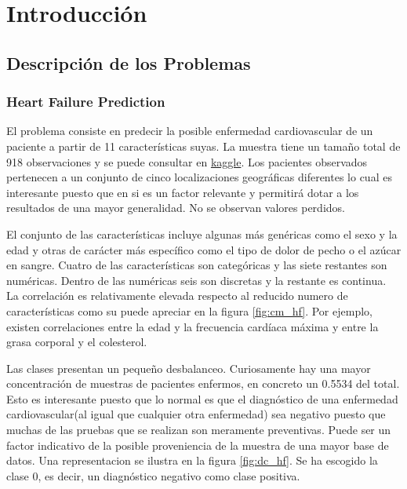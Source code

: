 \documentclass[..]{subfiles}
\begin{document}
\section{Introducción}

\subsection{Descripción de los Problemas}

\subsubsection{Heart Failure Prediction}
El problema consiste en predecir la posible enfermedad cardiovascular de un paciente a partir de 11 características suyas. La muestra tiene un tamaño total de 918 observaciones y se puede consultar en \hyperlink{https://www.kaggle.com/fedesoriano/heart-failure-prediction}{kaggle}. Los pacientes observados pertenecen a un conjunto de cinco localizaciones geográficas diferentes lo cual es interesante puesto que en si es un factor relevante y permitirá dotar a los resultados de una mayor generalidad. No se observan valores perdidos.

El conjunto de las características incluye algunas más genéricas como el sexo y la edad y otras de carácter más específico como el tipo de dolor de pecho o el azúcar en sangre. Cuatro de las características son categóricas y las siete restantes son numéricas. Dentro de las numéricas seis son discretas y la restante es continua. La correlación es relativamente elevada respecto al reducido numero de características como su puede apreciar en la figura \ref{fig:cm_hf}. Por ejemplo, existen correlaciones entre la edad y la frecuencia cardíaca máxima y entre la grasa corporal y el colesterol.

Las clases presentan un pequeño desbalanceo. Curiosamente hay una mayor concentración de muestras de pacientes enfermos, en concreto un 0.5534 del total. Esto es interesante puesto que lo normal es que el diagnóstico de una enfermedad cardiovascular(al igual que cualquier otra enfermedad) sea negativo puesto que muchas de las pruebas que se realizan son meramente preventivas. Puede ser un factor indicativo de la posible proveniencia de la muestra de una mayor base de datos. Una representacion se ilustra en la figura \ref{fig:dc_hf}. Se ha escogido la clase 0, es decir, un diagnóstico negativo como clase positiva.

\begin{figure}[h!]
	\centering
	   \hspace{1.0cm}
	   \caption{}
\end{figure}
\end{document}
